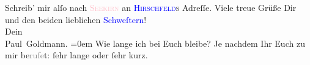\pstart
           Schreib’ mir alſo nach \textsc{\textcolor{pink}{Seekirn}{}\ledrightnote{\textcolor{pink}{Sekirn}}} an \textsc{\textcolor{blue}{Hirschfeld}{}\ledrightnote{\textcolor{blue}{Robert Hirschfeld}}s} Adreſſe. Viele treue Grüße
               Dir und den beiden lieblichen \textcolor{blue}{Schweſtern}{}\ledrightnote{{$\rightarrow$}\textcolor{blue}{Olga Schnitzler}{\newline}{$\rightarrow$}\textcolor{blue}{Elisabeth Steinrück}}! {\\[\baselineskip]}Dein {\\[\baselineskip]}\spacefill\mbox{Paul Goldmann.}\pend
           \leftskip=0em{}
\pstart
           \noindent{}Wie lange ich bei Euch bleibe? Je nachdem Ihr Euch zu mir
                     be\textcolor{gray}{rufe}t: ſehr lange oder ſehr kurz.\pend
           \endnumbering{}
\begin{anhang}
\end{anhang}
      